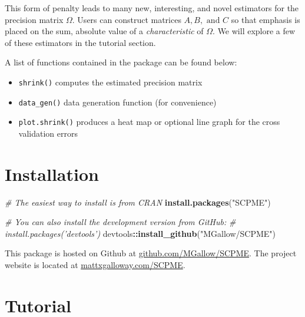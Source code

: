 \documentclass[11pt,]{report}
\newenvironment{Shaded}{\begin{snugshade}}{\end{snugshade}}
\newcommand{\CommentTok}[1]{\textcolor[rgb]{0.56,0.35,0.01}{\textit{#1}}}
\newcommand{\KeywordTok}[1]{\textcolor[rgb]{0.13,0.29,0.53}{\textbf{#1}}}
\newcommand{\NormalTok}[1]{#1}
\newcommand{\OperatorTok}[1]{\textcolor[rgb]{0.81,0.36,0.00}{\textbf{#1}}}
\newcommand{\StringTok}[1]{\textcolor[rgb]{0.31,0.60,0.02}{#1}}
\theoremstyle{definition}
\theoremstyle{definition}
\theoremstyle{definition}
\theoremstyle{remark}
\begin{document}
This form of penalty leads to many new, interesting, and novel estimators for the precision matrix \(\Omega\). Users can construct matrices \(A, B, \mbox{ and } C\) so that emphasis is placed on the sum, absolute value of a \emph{characteristic} of \(\Omega\). We will explore a few of these estimators in the tutorial section.

A list of functions contained in the package can be found below:

\begin{itemize}
\item
  \texttt{shrink()} computes the estimated precision matrix
\item
  \texttt{data\_gen()} data generation function (for convenience)
\item
  \texttt{plot.shrink()} produces a heat map or optional line graph for the cross validation errors
\end{itemize}

\hypertarget{installation-1}{%
\section{Installation}\label{installation-1}}

\begin{Shaded}
\begin{Highlighting}[]
\CommentTok{# The easiest way to install is from CRAN}
\KeywordTok{install.packages}\NormalTok{(}\StringTok{"SCPME"}\NormalTok{)}

\CommentTok{# You can also install the development version from GitHub:}
\CommentTok{# install.packages('devtools')}
\NormalTok{devtools}\OperatorTok{::}\KeywordTok{install_github}\NormalTok{(}\StringTok{"MGallow/SCPME"}\NormalTok{)}
\end{Highlighting}
\end{Shaded}

\vspace{0.5cm}

This package is hosted on Github at \href{https://github.com/MGallow/SCPME}{github.com/MGallow/SCPME}. The project website is located at \href{http://mattxgalloway.com/SCPME/}{mattxgalloway.com/SCPME}.

\hypertarget{tutorial-1}{%
\section{Tutorial}\label{tutorial-1}}
\end{document}
